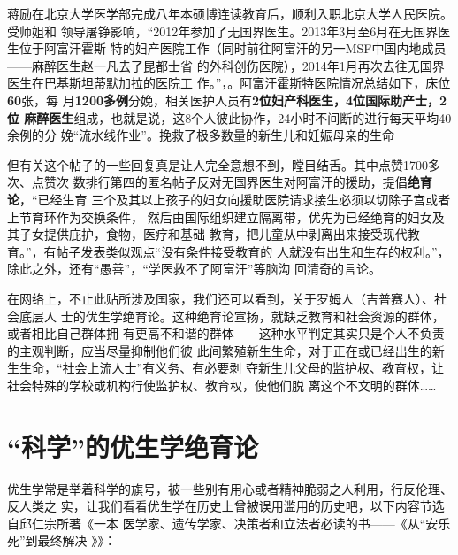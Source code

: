 蒋励在北京大学医学部完成八年本硕博连读教育后，顺利入职北京大学人民医院。受师姐和
领导屠铮影响，“2012年参加了无国界医生。2013年3月至6月在无国界医生位于阿富汗霍斯
特的妇产医院工作（同时前往阿富汗的另一MSF中国内地成员——麻醉医生赵一凡去了昆都士省
的外科创伤医院），2014年1月再次去往无国界医生在巴基斯坦蒂默加拉的医院工
作。”，\cite{jiangli}。阿富汗霍斯特医院情况总结如下，床位\textbf{60}张，每
月\textbf{1200多例}分娩，相关医护人员有\textbf{2位妇产科医生，4位国际助产士，2位
  麻醉医生}组成，也就是说，这8个人彼此协作，24小时不间断的进行每天平均40余例的分
娩“流水线作业”。挽救了极多数量的新生儿和妊娠母亲的生命

但有关这个帖子的一些回复真是让人完全意想不到，瞠目结舌。其中点赞1700多次、点赞次
数排行第四的匿名帖子反对无国界医生对阿富汗的援助，提倡\textbf{绝育论}，“已经生育
三个及其以上孩子的妇女向援助医院请求接生必须以切除子宫或者上节育环作为交换条件，
然后由国际组织建立隔离带，优先为已经绝育的妇女及其子女提供庇护，食物，医疗和基础
教育，把儿童从中剥离出来接受现代教育。”，有帖子发表类似观点“没有条件接受教育的
人就没有出生和生存的权利。”，除此之外，还有“愚善”，“学医救不了阿富汗”等脑沟
回清奇的言论。

在网络上，不止此贴所涉及国家，我们还可以看到，关于罗姆人（吉普赛人）、社会底层人
士的优生学绝育论。这种绝育论宣扬，就缺乏教育和社会资源的群体，或者相比自己群体拥
有更高不和谐的群体——这种水平判定其实只是个人不负责的主观判断，应当尽量抑制他们彼
此间繁殖新生生命，对于正在或已经出生的新生生命，“社会上流人士”有义务、有必要剥
夺新生儿父母的监护权、教育权，让社会特殊的学校或机构行使监护权、教育权，使他们脱
离这个不文明的群体……

\section{“科学”的优生学绝育论}

优生学常是举着科学的旗号，被一些别有用心或者精神脆弱之人利用，行反伦理、反人类之
实，让我们看看优生学在历史上曾被误用滥用的历史吧，以下内容节选自邱仁宗所著《一本
医学家、遗传学家、决策者和立法者必读的书——《从“安乐死”到最终解决
》》\cite{yousheng}：

